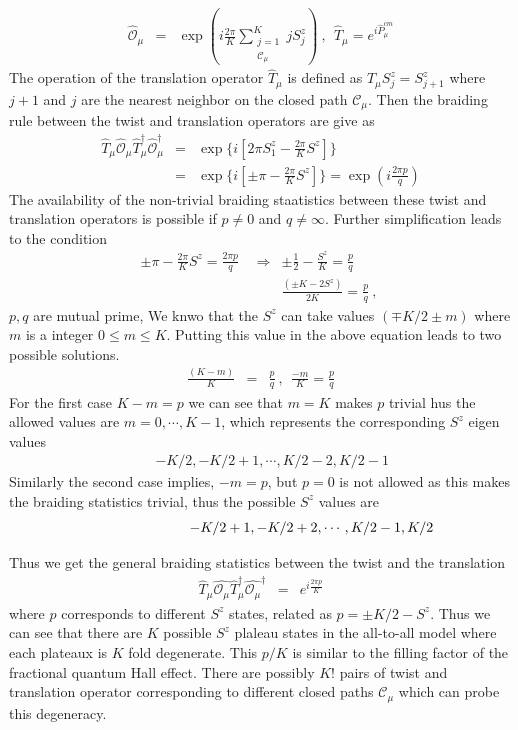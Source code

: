\documentclass[reprint,prb,superscriptaddress]{revtex4-2}
\begin{document}
\begin{eqnarray}
\hat{\mathcal{O}}_{\mu} &=& \exp({i\frac{2\pi}{K} \displaystyle\sum_{\substack{j=1\\ \mathcal{C}_{\mu}}}^{K} j S_j^z} )~,~~\hat{T}_{\mu}=e^{i\hat{P}^{cm}_{{\mu}}}
\end{eqnarray}
The  operation of the translation operator $\hat{T}_{\mu}$ is defined as $\hat{T}_{\mu} S_j^z = S_{j+1}^z$ where $j+1$ and $j$ are the nearest neighbor on the closed path $\mathcal{C}_{\mu}$. Then the braiding rule between the twist and translation operators are give as
\begin{eqnarray}
\hat{T}_{\mu}\hat{\mathcal{O}}_{\mu} \hat{T}^{\dagger}_{\mu} \hat{\mathcal{O}}_{\mu}^{\dagger}  &=&  \exp\{i[2\pi S_1^z-\frac{2\pi}{K}S^z]\} \nonumber\\
&=& \exp\{i[\pm \pi - \frac{2\pi}{K} S^z]\} =\exp(i\frac{2\pi p}{q})
\end{eqnarray}
The availability of the non-trivial braiding staatistics between these twist and translation operators is possible if $p\neq 0$ and $q\neq \infty$. Further simplification leads to the condition
\begin{eqnarray}
 \pm\pi -\frac{2\pi}{K} S^z = \frac{2\pi p}{q} ~~ &\Rightarrow & \pm\frac{1}{2}-\frac{S^z}{K} = \frac{p}{q} \nonumber\\
&& \frac{(\pm K-2S^z)}{2K} = \frac{p}{q}~,~
\end{eqnarray} 
$p,q$ are mutual prime, We knwo that the $S^z$ can take values $(\mp K/2\pm m)$ where $m$ is a integer $0 \leq m \leq K$. Putting this value in the above equation leads to two possible solutions.
\begin{eqnarray}
\frac{(K-m)}{K} &=& \frac{p}{q} ~,~~ \frac{-m}{K}=\frac{p}{q}
\end{eqnarray}
For the first case $K-m=p$ we can see that $m=K$ makes $p$ trivial hus the allowed values are $m=0,\cdots,K-1$, which represents the corresponding $S^z$ eigen values 
\begin{eqnarray}
&&-K/2,-K/2+1,\cdots,K/2-2,K/2-1
\end{eqnarray}
Similarly the second case implies, $-m=p$, but $p=0$ is not allowed as this makes the braiding statistics trivial, thus the possible $S^z$ values are 
\begin{eqnarray}
&&\hspace{2.2cm} -K/2+1,-K/2+2,\cdots,K/2-1,K/2
\end{eqnarray}

\noindent Thus we get the general braiding statistics between the twist and the translation 
\begin{eqnarray}
\hat{T}_{\mu}\hat{\mathcal{O}_{\mu}} \hat{T}^{\dagger}_{\mu}\hat{\mathcal{O}_{\mu}}^{\dagger} &=& e^{i\frac{2\pi p}{K}}
\end{eqnarray}
where $p$ corresponds to different $S^z$ states, related as $p=\pm K/2-S^z$. Thus we can see that there are $K$ possible $S^z$ plaleau states in the all-to-all model where each plateaux is $K$ fold degenerate. This $p/K$ is similar to the filling factor of the fractional quantum Hall effect. There are possibly $K!$ pairs of twist and translation operator corresponding to different closed paths $\mathcal{C}_{\mu}$ which can probe this degeneracy.
\end{document}
